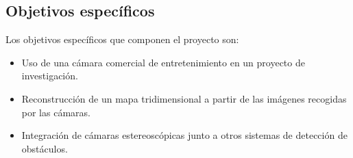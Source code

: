 \subsection{Objetivos específicos}

Los objetivos específicos que componen el proyecto son:
\begin{itemize}
\item Uso de una cámara comercial de entretenimiento en un proyecto de
investigación.
\item Reconstrucción de un mapa tridimensional a partir de las imágenes
recogidas por las cámaras.
\item Integración de cámaras estereoscópicas junto a otros sistemas de detección
de obstáculos.
\end{itemize}



%

